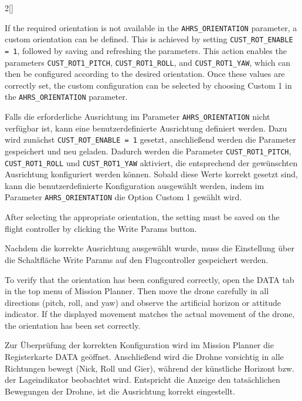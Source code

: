 \begin{paracol}{2}[]
\coleng

If the required orientation is not available in the \verb!AHRS_ORIENTATION! parameter, a custom orientation can be defined. This is achieved by setting \verb!CUST_ROT_ENABLE = 1!, followed by saving and refreshing the parameters. This action enables the parameters \verb!CUST_ROT1_PITCH!, \verb!CUST_ROT1_ROLL!, and \verb!CUST_ROT1_YAW!, which can then be configured according to the desired orientation. Once these values are correctly set, the custom configuration can be selected by choosing Custom 1 in the \verb!AHRS_ORIENTATION! parameter.

\colger

Falls die erforderliche Ausrichtung im Parameter \verb!AHRS_ORIENTATION! nicht verfügbar ist, kann eine benutzerdefinierte Ausrichtung definiert werden. Dazu wird zunächst \verb!CUST_ROT_ENABLE = 1! gesetzt, anschließend werden die Parameter gespeichert und neu geladen. Dadurch werden die Parameter \verb!CUST_ROT1_PITCH!, \verb!CUST_ROT1_ROLL! und \verb!CUST_ROT1_YAW! aktiviert, die entsprechend der gewünschten Ausrichtung konfiguriert werden können. Sobald diese Werte korrekt gesetzt sind, kann die benutzerdefinierte Konfiguration ausgewählt werden, indem im Parameter \verb!AHRS_ORIENTATION! die Option Custom 1 gewählt wird.

\coleng

After selecting the appropriate orientation, the setting must be saved on the flight controller by clicking the Write Params button.

\colger

Nachdem die korrekte Ausrichtung ausgewählt wurde, muss die Einstellung über die Schaltfläche Write Params auf den Flugcontroller gespeichert werden.

\coleng

To verify that the orientation has been configured correctly, open the DATA tab in the top menu of Mission Planner. Then move the drone carefully in all directions (pitch, roll, and yaw) and observe the artificial horizon or attitude indicator. If the displayed movement matches the actual movement of the drone, the orientation has been set correctly.

\colger

Zur Überprüfung der korrekten Konfiguration wird im Mission Planner die Registerkarte DATA geöffnet. Anschließend wird die Drohne vorsichtig in alle Richtungen bewegt (Nick, Roll und Gier), während der künstliche Horizont bzw. der Lageindikator beobachtet wird. Entspricht die Anzeige den tatsächlichen Bewegungen der Drohne, ist die Ausrichtung korrekt eingestellt.


\end{paracol}
